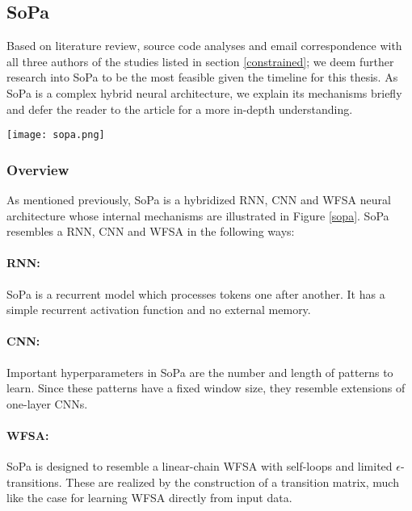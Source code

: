 \subsection{SoPa}

Based on literature review, source code analyses and email correspondence with all three authors of the studies listed in section \ref{constrained}; we deem further research into SoPa to be the most feasible given the timeline for this thesis. As SoPa is a complex hybrid neural architecture, we explain its mechanisms briefly and defer the reader to the article for a more in-depth understanding.

\begin{figure*}
  \centering 
  \texttt{[image: sopa.png]} 
  \caption{Schematic of the SoPa neural architecture \citep{schwartz2018sopa}}
  \label{sopa}
\end{figure*}

\subsubsection{Overview}

As mentioned previously, SoPa is a hybridized RNN, CNN and WFSA neural architecture whose internal mechanisms are illustrated in Figure \ref{sopa}. SoPa resembles a RNN, CNN and WFSA in the following ways:

\paragraph{RNN:} SoPa is a recurrent model which processes tokens one after another. It has a simple recurrent activation function and no external memory.

\paragraph{CNN:} Important hyperparameters in SoPa are the number and length of patterns to learn. Since these patterns have a fixed window size, they resemble extensions of one-layer CNNs.

\paragraph{WFSA:} SoPa is designed to resemble a linear-chain WFSA with self-loops and limited $\epsilon$-transitions. These are realized by the construction of a transition matrix, much like the case for learning WFSA directly from input data.

